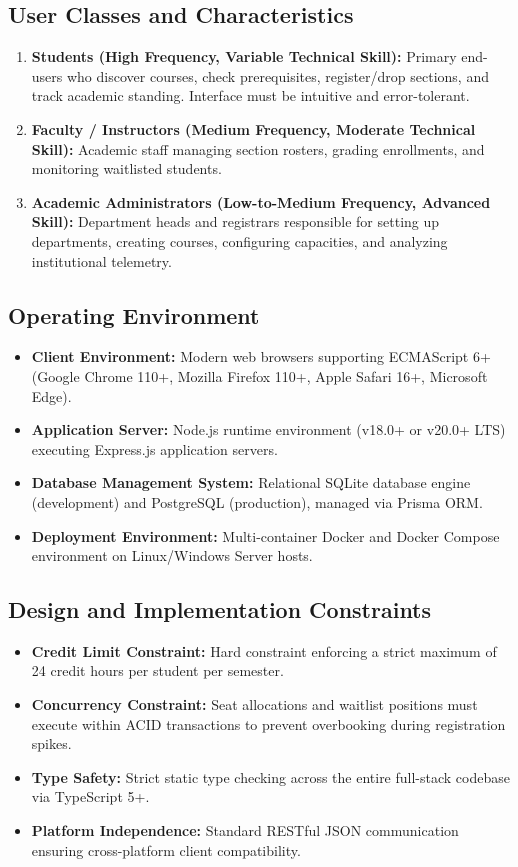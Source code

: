 \documentclass[a4paper,12pt]{article}
\begin{document}
\subsection{User Classes and Characteristics}
\begin{enumerate}[leftmargin=1.2cm]
    \item \textbf{Students (High Frequency, Variable Technical Skill):} Primary end-users who discover courses, check prerequisites, register/drop sections, and track academic standing. Interface must be intuitive and error-tolerant.
    \item \textbf{Faculty / Instructors (Medium Frequency, Moderate Technical Skill):} Academic staff managing section rosters, grading enrollments, and monitoring waitlisted students.
    \item \textbf{Academic Administrators (Low-to-Medium Frequency, Advanced Skill):} Department heads and registrars responsible for setting up departments, creating courses, configuring capacities, and analyzing institutional telemetry.
\end{enumerate}

\subsection{Operating Environment}
\begin{itemize}[leftmargin=1.2cm]
    \item \textbf{Client Environment:} Modern web browsers supporting ECMAScript 6+ (Google Chrome 110+, Mozilla Firefox 110+, Apple Safari 16+, Microsoft Edge).
    \item \textbf{Application Server:} Node.js runtime environment (v18.0+ or v20.0+ LTS) executing Express.js application servers.
    \item \textbf{Database Management System:} Relational SQLite database engine (development) and PostgreSQL (production), managed via Prisma ORM.
    \item \textbf{Deployment Environment:} Multi-container Docker and Docker Compose environment on Linux/Windows Server hosts.
\end{itemize}

\subsection{Design and Implementation Constraints}
\begin{itemize}[leftmargin=1.2cm]
    \item \textbf{Credit Limit Constraint:} Hard constraint enforcing a strict maximum of 24 credit hours per student per semester.
    \item \textbf{Concurrency Constraint:} Seat allocations and waitlist positions must execute within ACID transactions to prevent overbooking during registration spikes.
    \item \textbf{Type Safety:} Strict static type checking across the entire full-stack codebase via TypeScript 5+.
    \item \textbf{Platform Independence:} Standard RESTful JSON communication ensuring cross-platform client compatibility.
\end{itemize}
\end{document}
